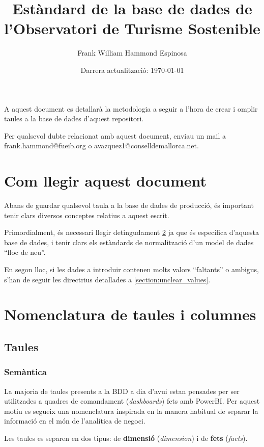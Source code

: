 \documentclass{article}
\title{Estàndard de la base de dades de \\l'Observatori de Turisme Sostenible}
\author{Frank William Hammond Espinosa}
\date{Darrera actualització: \today}
\theoremstyle{definition}
\begin{document}
\maketitle
\tableofcontents

A aquest document es detallarà la metodologia a seguir a l'hora de crear i omplir taules a la base de dades d'aquest repositori.

Per qualsevol dubte relacionat amb aquest document, enviau un mail a frank.hammond@fueib.org o avazquez1@conselldemallorca.net.

\section{Com llegir aquest document}\label{section:howtoread}

Abans de guardar qualsevol taula a la base de dades de producció, és important tenir clars diversos conceptes relatius a aquest escrit.

Primordialment, és necessari llegir detingudament \cref{section:nomenclature} ja que és específica d'aquesta base de dades, i tenir clars els estàndards de normalització d'un model de dades ``floc de neu''.

En segon lloc, si les dades a introduir contenen molts valors ``faltants'' o ambigus, s'han de seguir les directrius detallades a \cref{section:unclear_values}.

\section{Nomenclatura de taules i columnes}\label{section:nomenclature}
\subsection{Taules}\label{section:nomenclature:tables}
\subsubsection{Semàntica}\label{section:nomenclature:tables:semantics}
La majoria de taules presents a la BDD a dia d'avui estan pensades per ser utilitzades a quadres de comandament (\emph{dashboards}) fets amb PowerBI. Per aquest motiu es segueix una nomenclatura inspirada en la manera habitual de separar la informació en el món de l'analítica de negoci.

Les taules es separen en dos tipus: de \textbf{dimensió} (\emph{dimension}) i de \textbf{fets} (\emph{facts}).
\end{document}
